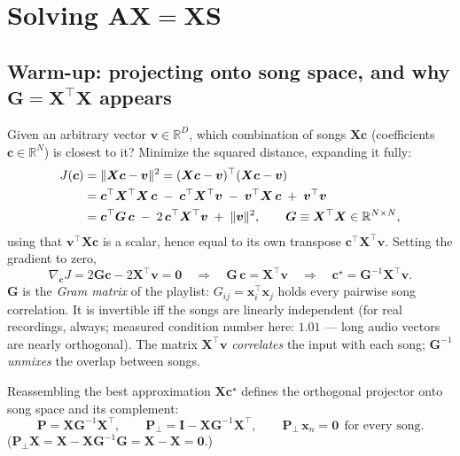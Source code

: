 \documentclass[11pt]{article}
\newcommand{\mA}{\bm{A}}
\newcommand{\mX}{\bm{X}}
\newcommand{\mS}{\bm{S}}
\newcommand{\mG}{\bm{G}}
\newcommand{\mI}{\bm{I}}
\newcommand{\mP}{\bm{P}}
\newcommand{\mPp}{\bm{P}_{\!\perp}}
\newcommand{\vx}{\bm{x}}
\newcommand{\vv}{\bm{v}}
\newcommand{\vc}{\bm{c}}
\newcommand{\R}{\mathbb{R}}
\newcommand{\norm}[1]{\lVert #1 \rVert}
\begin{document}
\section{Solving \texorpdfstring{$\mA\mX = \mX\mS$}{AX = XS}}

\subsection{Warm-up: projecting onto song space, and why
\texorpdfstring{$\mG=\mX^\top\mX$}{G = XtX} appears}

Given an arbitrary vector $\vv \in \R^D$, which combination of songs
$\mX\vc$ (coefficients $\vc \in \R^N$) is closest to it? Minimize the
squared distance, expanding it fully:
\begin{align}
  J(\vc)
  &= \norm{\mX\vc - \vv}^2
   = (\mX\vc - \vv)^\top(\mX\vc - \vv) \notag\\
  &= \vc^\top\mX^\top\mX\,\vc \;-\; \vc^\top \mX^\top\vv
     \;-\; \vv^\top\mX\,\vc \;+\; \vv^\top\vv \notag\\
  &= \vc^\top \mG\, \vc \;-\; 2\,\vc^\top \mX^\top \vv \;+\; \norm{\vv}^2,
  \qquad \mG \equiv \mX^\top\mX \in \R^{N\times N},
\end{align}
using that $\vv^\top\mX\vc$ is a scalar, hence equal to its own transpose
$\vc^\top\mX^\top\vv$. Setting the gradient to zero,
\begin{equation}
  \nabla_{\vc} J = 2\mG\vc - 2\mX^\top\vv = \bm{0}
  \quad\Longrightarrow\quad
  \mG\,\vc = \mX^\top\vv
  \quad\Longrightarrow\quad
  \vc^\star = \mG^{-1}\mX^\top\vv .
  \label{eq:normaleq}
\end{equation}
$\mG$ is the \emph{Gram matrix} of the playlist: $G_{ij} = \vx_i^\top\vx_j$
holds every pairwise song correlation. It is invertible iff the songs are
linearly independent (for real recordings, always; measured condition
number here: $1.01$ --- long audio vectors are nearly orthogonal). The
matrix $\mX^\top\vv$ \emph{correlates} the input with each song; $\mG^{-1}$
\emph{unmixes} the overlap between songs.

Reassembling the best approximation $\mX\vc^\star$ defines the orthogonal
projector onto song space and its complement:
\begin{equation}
  \mP = \mX\mG^{-1}\mX^\top, \qquad
  \mPp = \mI - \mX\mG^{-1}\mX^\top,
  \qquad
  \mPp\,\vx_n = \bm{0} \ \ \text{for every song.}
  \label{eq:projectors}
\end{equation}
($\mPp\mX = \mX - \mX\mG^{-1}\mG = \mX - \mX = \bm{0}$.)
\end{document}
